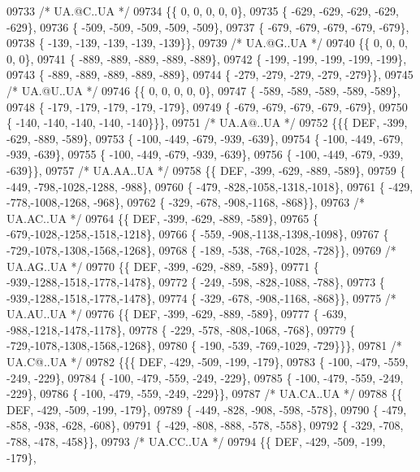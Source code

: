 \begin{DoxyCode}
09733 \textcolor{comment}{/* UA.@C..UA */}
09734 \{\{    0,    0,    0,    0,    0\},
09735 \{ -629, -629, -629, -629, -629\},
09736 \{ -509, -509, -509, -509, -509\},
09737 \{ -679, -679, -679, -679, -679\},
09738 \{ -139, -139, -139, -139, -139\}\},
09739 \textcolor{comment}{/* UA.@G..UA */}
09740 \{\{    0,    0,    0,    0,    0\},
09741 \{ -889, -889, -889, -889, -889\},
09742 \{ -199, -199, -199, -199, -199\},
09743 \{ -889, -889, -889, -889, -889\},
09744 \{ -279, -279, -279, -279, -279\}\},
09745 \textcolor{comment}{/* UA.@U..UA */}
09746 \{\{    0,    0,    0,    0,    0\},
09747 \{ -589, -589, -589, -589, -589\},
09748 \{ -179, -179, -179, -179, -179\},
09749 \{ -679, -679, -679, -679, -679\},
09750 \{ -140, -140, -140, -140, -140\}\}\},
09751 \textcolor{comment}{/* UA.A@..UA */}
09752 \{\{\{  DEF, -399, -629, -889, -589\},
09753 \{ -100, -449, -679, -939, -639\},
09754 \{ -100, -449, -679, -939, -639\},
09755 \{ -100, -449, -679, -939, -639\},
09756 \{ -100, -449, -679, -939, -639\}\},
09757 \textcolor{comment}{/* UA.AA..UA */}
09758 \{\{  DEF, -399, -629, -889, -589\},
09759 \{ -449, -798,-1028,-1288, -988\},
09760 \{ -479, -828,-1058,-1318,-1018\},
09761 \{ -429, -778,-1008,-1268, -968\},
09762 \{ -329, -678, -908,-1168, -868\}\},
09763 \textcolor{comment}{/* UA.AC..UA */}
09764 \{\{  DEF, -399, -629, -889, -589\},
09765 \{ -679,-1028,-1258,-1518,-1218\},
09766 \{ -559, -908,-1138,-1398,-1098\},
09767 \{ -729,-1078,-1308,-1568,-1268\},
09768 \{ -189, -538, -768,-1028, -728\}\},
09769 \textcolor{comment}{/* UA.AG..UA */}
09770 \{\{  DEF, -399, -629, -889, -589\},
09771 \{ -939,-1288,-1518,-1778,-1478\},
09772 \{ -249, -598, -828,-1088, -788\},
09773 \{ -939,-1288,-1518,-1778,-1478\},
09774 \{ -329, -678, -908,-1168, -868\}\},
09775 \textcolor{comment}{/* UA.AU..UA */}
09776 \{\{  DEF, -399, -629, -889, -589\},
09777 \{ -639, -988,-1218,-1478,-1178\},
09778 \{ -229, -578, -808,-1068, -768\},
09779 \{ -729,-1078,-1308,-1568,-1268\},
09780 \{ -190, -539, -769,-1029, -729\}\}\},
09781 \textcolor{comment}{/* UA.C@..UA */}
09782 \{\{\{  DEF, -429, -509, -199, -179\},
09783 \{ -100, -479, -559, -249, -229\},
09784 \{ -100, -479, -559, -249, -229\},
09785 \{ -100, -479, -559, -249, -229\},
09786 \{ -100, -479, -559, -249, -229\}\},
09787 \textcolor{comment}{/* UA.CA..UA */}
09788 \{\{  DEF, -429, -509, -199, -179\},
09789 \{ -449, -828, -908, -598, -578\},
09790 \{ -479, -858, -938, -628, -608\},
09791 \{ -429, -808, -888, -578, -558\},
09792 \{ -329, -708, -788, -478, -458\}\},
09793 \textcolor{comment}{/* UA.CC..UA */}
09794 \{\{  DEF, -429, -509, -199, -179\},

\end{DoxyCode}
